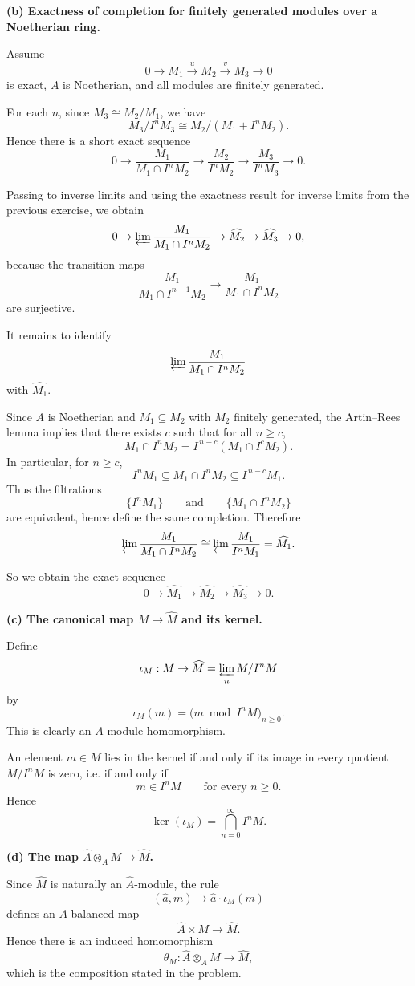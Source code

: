 \documentclass[12pt,a4paper]{article}
\theoremstyle{plain}
\theoremstyle{definition}      %
\begin{document}
\bigskip
\textbf{(b) Exactness of completion for finitely generated modules over a Noetherian ring.}

Assume
\[
0\to M_1 \xrightarrow{u} M_2 \xrightarrow{v} M_3 \to 0
\]
is exact, \(A\) is Noetherian, and all modules are finitely generated.

For each \(n\), since \(M_3\cong M_2/M_1\), we have
\[
M_3/I^nM_3 \cong M_2/(M_1+I^nM_2).
\]
Hence there is a short exact sequence
\[
0\to \frac{M_1}{M_1\cap I^nM_2}
\to \frac{M_2}{I^nM_2}
\to \frac{M_3}{I^nM_3}
\to 0.
\]

Passing to inverse limits and using the exactness result for inverse limits from the previous exercise, we obtain
\[
0\to \varprojlim \frac{M_1}{M_1\cap I^nM_2}
\to \widehat{M_2}
\to \widehat{M_3}
\to 0,
\]
because the transition maps
\[
\frac{M_1}{M_1\cap I^{n+1}M_2}\to \frac{M_1}{M_1\cap I^nM_2}
\]
are surjective.

It remains to identify
\[
\varprojlim \frac{M_1}{M_1\cap I^nM_2}
\]
with \(\widehat{M_1}\).

Since \(A\) is Noetherian and \(M_1\subseteq M_2\) with \(M_2\) finitely generated, the Artin--Rees lemma implies that there exists \(c\) such that for all \(n\ge c\),
\[
M_1\cap I^nM_2 = I^{\,n-c}(M_1\cap I^cM_2).
\]
In particular, for \(n\ge c\),
\[
I^nM_1 \subseteq M_1\cap I^nM_2 \subseteq I^{\,n-c}M_1.
\]
Thus the filtrations
\[
\{I^nM_1\}
\qquad\text{and}\qquad
\{M_1\cap I^nM_2\}
\]
are equivalent, hence define the same completion. Therefore
\[
\varprojlim \frac{M_1}{M_1\cap I^nM_2}
\cong
\varprojlim \frac{M_1}{I^nM_1}
=
\widehat{M_1}.
\]

So we obtain the exact sequence
\[
0\to \widehat{M_1}\to \widehat{M_2}\to \widehat{M_3}\to 0.
\]

\bigskip
\textbf{(c) The canonical map \(M\to \widehat{M}\) and its kernel.}

Define
\[
\iota_M:M\to \widehat{M}=\varprojlim_n M/I^nM
\]
by
\[
\iota_M(m)=\bigl(m \bmod I^nM\bigr)_{n\ge 0}.
\]
This is clearly an \(A\)-module homomorphism.

An element \(m\in M\) lies in the kernel if and only if its image in every quotient \(M/I^nM\) is zero, i.e. if and only if
\[
m\in I^nM
\qquad\text{for every }n\ge 0.
\]
Hence
\[
\ker(\iota_M)=\bigcap_{n=0}^{\infty} I^nM.
\]

\bigskip
\textbf{(d) The map \(\widehat{A}\otimes_A M\to \widehat{M}\).}

Since \(\widehat{M}\) is naturally an \(\widehat{A}\)-module, the rule
\[
(\hat a,m)\longmapsto \hat a\cdot \iota_M(m)
\]
defines an \(A\)-balanced map
\[
\widehat{A}\times M\to \widehat{M}.
\]
Hence there is an induced homomorphism
\[
\theta_M:\widehat{A}\otimes_A M\to \widehat{M},
\]
which is the composition stated in the problem.
\end{document}
